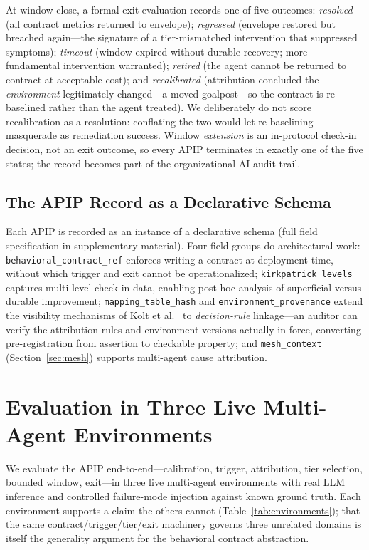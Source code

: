 \documentclass[conference]{IEEEtran}
\newcommand{\code}[1]{\texttt{\small #1}}
\begin{document}
At window close, a formal exit evaluation records one of five outcomes:
\emph{resolved} (all contract metrics returned to envelope); \emph{regressed}
(envelope restored but breached again---the signature of a tier-mismatched
intervention that suppressed symptoms); \emph{timeout} (window expired without durable
recovery; more fundamental intervention warranted); \emph{retired} (the agent
cannot be returned to contract at acceptable cost); and \emph{recalibrated}
(attribution concluded the \emph{environment} legitimately changed---a moved
goalpost---so the contract is re-baselined rather than the agent treated). We
deliberately do not score recalibration as a resolution: conflating the two
would let re-baselining masquerade as remediation success. Window
\emph{extension} is an in-protocol check-in decision, not an exit outcome, so
every APIP terminates in exactly one of the five states; the record becomes
part of the organizational AI audit trail.

\subsection{The APIP Record as a Declarative Schema}
\label{sec:schema}

Each APIP is recorded as an instance of a declarative schema (full field
specification in supplementary material). Four field groups do architectural
work: \code{behavioral\_contract\_ref} enforces writing a contract at
deployment time, without which trigger and exit cannot be operationalized;
\code{kirkpatrick\_levels} captures multi-level check-in data, enabling
post-hoc analysis of superficial versus durable improvement;
\code{mapping\_table\_hash} and \code{environment\_provenance} extend the
visibility mechanisms of Kolt et al.\ \cite{kolt2024} to \emph{decision-rule}
linkage---an auditor can verify the attribution rules and environment versions
actually in force, converting pre-registration from assertion to checkable
property; and \code{mesh\_context} (Section~\ref{sec:mesh}) supports
multi-agent cause attribution.

\section{Evaluation in Three Live Multi-Agent Environments}
\label{sec:evaluation}

We evaluate the APIP end-to-end---calibration, trigger, attribution, tier
selection, bounded window, exit---in three live multi-agent environments with
real LLM inference and controlled failure-mode injection against known ground
truth. Each environment supports a claim the others cannot
(Table~\ref{tab:environments}); that the same contract/trigger/tier/exit
machinery governs three unrelated domains is itself the generality argument for
the behavioral contract abstraction.
\end{document}
